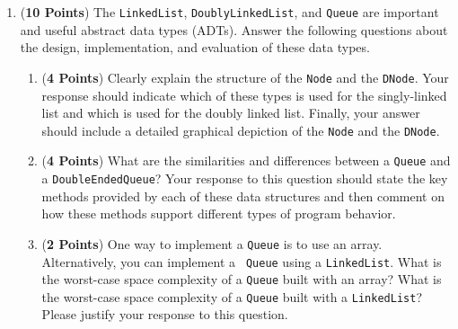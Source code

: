 \documentclass[12pt]{article}
\begin{document}
\begin{enumerate}
\begin{enumerate}
    {\tt
      public class ArrayIndexList<E> implements IndexList<E>}

    \begin{enumerate}

      \item What is the meaning of {\tt <E>}?

      \item Why does {\tt ArrayIndexList<E>} implement the  {\tt IndexList<E>}?

    \end{enumerate}

  \end{enumerate}

\newpage

\item ({\bf 10 Points}) The {\tt LinkedList}, {\tt DoublyLinkedList}, and {\tt Queue} are important and useful abstract
  data types (ADTs).  Answer the following questions about the design, implementation, and evaluation of these data
  types.

\begin{enumerate}

  \item ({\bf 4 Points}) Clearly explain the structure of the {\tt Node} and the {\tt DNode}.  Your response should
    indicate which of these types is used for the singly-linked list and which is used for the doubly linked list.
    Finally, your answer should include a detailed graphical depiction of the {\tt Node} and the {\tt DNode}.

  \item ({\bf 4 Points}) What are the similarities and differences between a {\tt Queue} and a {\tt DoubleEndedQueue}?
    Your response to this question should state the key methods provided by each of these data structures and then
    comment on how these methods support different types of program behavior.

  \item ({\bf 2 Points}) One way to implement a {\tt Queue} is to use an array.  Alternatively, you can implement a {\tt
      Queue} using a {\tt LinkedList}. What is the worst-case space complexity of a {\tt Queue} built with an array?
    What is the worst-case space complexity of a {\tt Queue} built with a {\tt LinkedList}? Please justify your
    response to this question.



\end{enumerate}
\end{enumerate}
\end{document}
